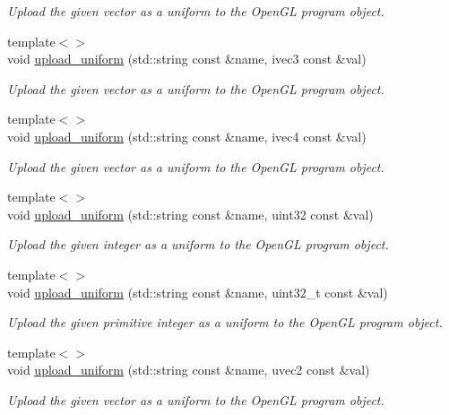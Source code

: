 \begin{DoxyCompactItemize}
\begin{DoxyCompactList}\small\item\em Upload the given vector as a uniform to the Open\-G\-L program object. \end{DoxyCompactList}\item 
{\footnotesize template$<$$>$ }\\void \hyperlink{classgfx_1_1program_af0fdec8101081f406a12972c0508e98a}{upload\-\_\-uniform} (std\-::string const \&name, ivec3 const \&val)
\begin{DoxyCompactList}\small\item\em Upload the given vector as a uniform to the Open\-G\-L program object. \end{DoxyCompactList}\item 
{\footnotesize template$<$$>$ }\\void \hyperlink{classgfx_1_1program_a4bc1046502033fa9a32201a4ce0f4b41}{upload\-\_\-uniform} (std\-::string const \&name, ivec4 const \&val)
\begin{DoxyCompactList}\small\item\em Upload the given vector as a uniform to the Open\-G\-L program object. \end{DoxyCompactList}\item 
{\footnotesize template$<$$>$ }\\void \hyperlink{classgfx_1_1program_a8b2a8069224d9d4b46b8d1ba3502ce1f}{upload\-\_\-uniform} (std\-::string const \&name, uint32 const \&val)
\begin{DoxyCompactList}\small\item\em Upload the given integer as a uniform to the Open\-G\-L program object. \end{DoxyCompactList}\item 
{\footnotesize template$<$$>$ }\\void \hyperlink{classgfx_1_1program_ae139f17939de4b5d01795b10fecccec6}{upload\-\_\-uniform} (std\-::string const \&name, uint32\-\_\-t const \&val)
\begin{DoxyCompactList}\small\item\em Upload the given primitive integer as a uniform to the Open\-G\-L program object. \end{DoxyCompactList}\item 
{\footnotesize template$<$$>$ }\\void \hyperlink{classgfx_1_1program_a0a4fd0922e71ddd475f50dceffa3ba88}{upload\-\_\-uniform} (std\-::string const \&name, uvec2 const \&val)
\begin{DoxyCompactList}\small\item\em Upload the given vector as a uniform to the Open\-G\-L program object. \end{DoxyCompactList}\item 

\end{DoxyCompactItemize}
